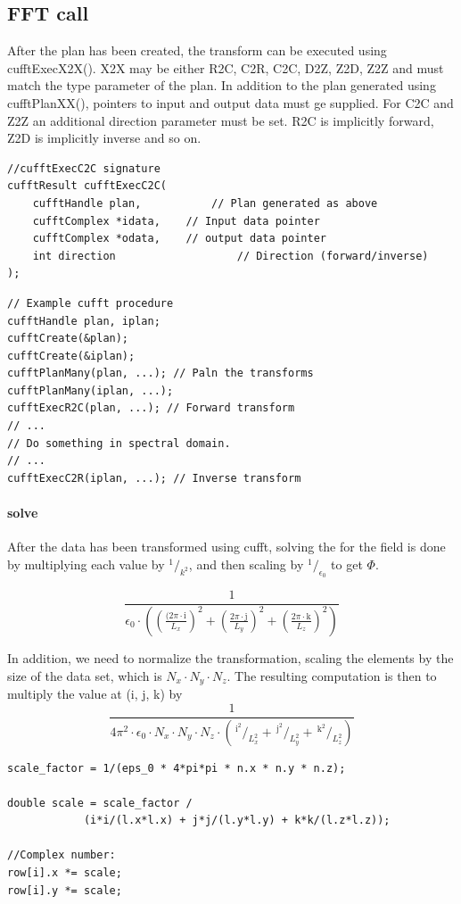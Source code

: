 \subsection{FFT call}
After the plan has been created, the transform can be executed using cufftExecX2X(). X2X may be either R2C, C2R, C2C,
D2Z, Z2D, Z2Z and must match the type parameter of the plan. In addition to the plan generated using cufftPlanXX(),
pointers to input and output data must ge supplied. For C2C and Z2Z an additional direction parameter must be set. R2C
is implicitly forward, Z2D is implicitly inverse and so on.
\begin{lstlisting}
//cufftExecC2C signature
cufftResult cufftExecC2C(
	cufftHandle plan,			// Plan generated as above
	cufftComplex *idata,	// Input data pointer
	cufftComplex *odata,	// output data pointer
	int direction					// Direction (forward/inverse)
);
\end{lstlisting}
\begin{lstlisting}
// Example cufft procedure
cufftHandle plan, iplan;
cufftCreate(&plan);
cufftCreate(&iplan);
cufftPlanMany(plan, ...); // Paln the transforms
cufftPlanMany(iplan, ...);
cufftExecR2C(plan, ...); // Forward transform
// ...
// Do something in spectral domain.
// ...
cufftExecC2R(iplan, ...); // Inverse transform
\end{lstlisting}

\paragraph{solve}
After the data has been transformed using cufft, solving the for the field is done by multiplying each value by
$^1\!/_{k^2} $, and then scaling by $ ^1\!/_{\epsilon_0} $ to get $\Phi$.

$$ \frac{1}{{\epsilon_0 \cdot \left(
	\left(\frac{(2\pi \cdot \text{i} }{ L_x}\right)^2 + \left(\frac{2\pi \cdot \text{j} }{ L_y}\right)^2 + \left(\frac{2\pi \cdot \text{k} }{ L_z}\right)^2
\right)}} $$

 In addition, we need to normalize the transformation, scaling the elements by the size of the data set, which is
 $N_x \cdot N_y \cdot N_z$. The resulting computation is then to multiply the value at (i, j, k) by
 $$ \frac{1}{{4\pi^2 \cdot \epsilon_0 \cdot N_x \cdot N_y \cdot N_z \cdot \left(\, ^{\text{i}^2}\!/_{L_x^2} +\, ^{\text{j}^2}\!/_{L_y^2} +\, ^{\text{k}^2}\!/_{L_z^2}\right)}} $$
\begin{lstlisting}
scale_factor = 1/(eps_0 * 4*pi*pi * n.x * n.y * n.z);

double scale = scale_factor /
			(i*i/(l.x*l.x) + j*j/(l.y*l.y) + k*k/(l.z*l.z));

//Complex number:
row[i].x *= scale;
row[i].y *= scale;
\end{lstlisting}

